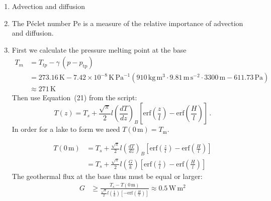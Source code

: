 \documentclass[10pt,DIV12,a4paper,halfparskip]{scrartcl}
\begin{document}
\begin{enumerate}
\item Advection and diffusion
\item The P\'eclet number Pe is a measure of the relative importance of advection and diffusion.
\item First we calculate the pressure melting point at the base
\begin{align*}
 \label{eq:clausius-pure}
 T_m &= T_{tp} - \gamma\, (p - p_{\text{tp}}) \\
 & = 273.16\,\text{K} -  7.42 \times 10^{-8} \,\text{K}\,\text{Pa}^{-1} \left(  910\,\text{kg}\,\text{m}^{3} \cdot 9.81\,\text{m}\,\text{s}^{-2}\cdot 3300\,\text{m}- 611.73\,\text{Pa}\right) \\
 & \approx 271\,\text{K}
\end{align*} Then use Equation~(21) from the script:
\begin{equation*}
  T(z) = T_s + \frac{\sqrt\pi}{2} l \left(\frac{dT}{dz}\right)_{B} 
 \left[ {\textrm{erf}} \left( \frac{z}{l} \right) - {\textrm{erf}} \left( \frac{H}{l} \right) \right]\,.
\end{equation*} In order for a lake to form we need $T(0\,\text{m}) = T_{\text{m}}$.

\begin{align*}
  T(0\,\text{m}) & = T_s + \frac{\sqrt\pi}{2} l \left(\frac{dT}{dz}\right)_{B} 
 \left[ {\textrm{erf}} \left( \frac{z}{l} \right) - {\textrm{erf}} \left( \frac{H}{l} \right) \right] \\
 & = T_s + \frac{\sqrt\pi}{2} l \left(\frac{G}{k}\right) 
 \left[ {\textrm{erf}} \left( \frac{z}{l} \right) - {\textrm{erf}} \left( \frac{H}{l} \right) \right]
\end{align*}
The geothermal flux at the base thus must be equal or larger:
\begin{align*}
 G & \ge \frac{T_s - T(0\,\text{m})}{\frac{\sqrt\pi}{2} l \left(\frac{1}{k}\right) 
 \left[  - {\textrm{erf}} \left( \frac{H}{l} \right) \right]} \approx 0.5\,\text{W}\,\text{m}^{2}
\end{align*}


\end{enumerate}
\end{document}
